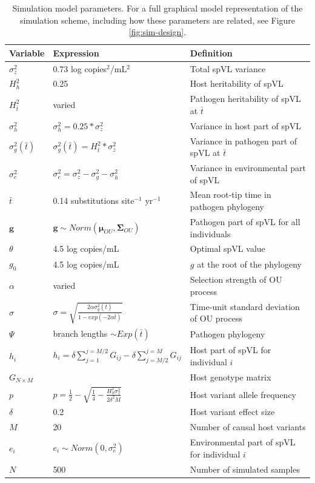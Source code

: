 \documentclass[11pt]{article}
\begin{document}
\begin{table}[H]
	\caption{Simulation model parameters. For a full graphical model representation of the simulation scheme, including how these parameters are related, see Figure \ref{fig:sim-design}.}
	\begin{tabularx}{\linewidth}{p{1.5cm}p{6.5cm}l} \toprule 
		Variable & Expression & Definition \\ \midrule 
		$\sigma^2_z$ &  0.73 log copies$^{2}$/mL$^{2}$ & Total spVL variance \\ 
		$H^2_h$ & 0.25 & Host heritability of spVL \\
		$H^2_{\bar{t}}$ & varied & Pathogen heritability of spVL at $\bar{t}$ \\
		$\sigma^2_{h}$ & $\sigma_{h}^2 = 0.25*\sigma_z^2$ & Variance in host part of spVL \\
		$\sigma^2_{g}(\bar{t})$ & $\sigma^2_{g}(\bar{t}) = H^2_{\bar{t}}*\sigma_z^2$ & Variance in pathogen part of spVL at $\bar{t}$ \\ 
		$\sigma^2_{e}$ & $\sigma_{e}^2 = \sigma_z^2 - \sigma^2_{g} - \sigma^2_{h}$ & Variance in environmental part of spVL \\ 
		$\bar{t}$ & 0.14 substitutions site$^{-1}$ yr$^{-1}$ & Mean root-tip time in pathogen phylogeny \\ 
		$\bm{g}$ & $\bm{g} \sim Norm(\bm{\mu}_{OU}, \boldsymbol{\Sigma}_{OU})$ & Pathogen part of spVL for all individuals \\ 
		$\theta$ & 4.5 log copies/mL & Optimal spVL value \\
		$g_{0}$ & 4.5 log copies/mL & $g$ at the root of the phylogeny  \\ 
		$\alpha$ & varied & Selection strength of OU process \\ 
		$\sigma$ & $\sigma = \sqrt{\frac{2\alpha\sigma^2_{g}(\bar{t})}{1 - exp(-2\alpha\bar{t})}}$ & Time-unit standard deviation of OU process \\ 
		$\Psi$ & branch lengths $\sim Exp(\bar{t})$ & Pathogen phylogeny \\ 
		$h_i$ & $h_i = \delta \sum_{j = 1}^{j = M/2}{G_{ij}} - \delta \sum_{j = M/2}^{j = M}{G_{ij}}$ & Host part of spVL for individual $i$ \\ 
		$G_{N \times M}$ & \makecell{$G_{ij} \sim Binom(2, p)\ \\ \forall i \in {1...N}, \forall j \in {1...M}$} & Host genotype matrix \\
		$p$ & $p = \frac{1}{2} - \sqrt{\frac{1}{4} - \frac{H_{h}^2\sigma^2_z}{2\delta^2M}}$ &  Host variant allele frequency \\ 
		$\delta$ & 0.2 & Host variant effect size \\ 
		$M$ & 20 & Number of causal host variants \\ 
		$e_i$ & $ e_i \sim Norm(0, \sigma^2_{e})$ & Environmental part of spVL for individual $i$ \\ 
		$N$ & 500 & Number of simulated samples \\ \bottomrule 
	\end{tabularx}
	\label{tab:sim-params}
\end{table}
\end{document}
